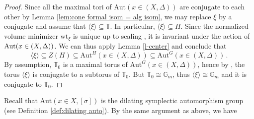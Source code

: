 \documentclass[12pt]{amsart}
\theoremstyle{definition}
\newcommand{\bT}{\mathbb{T}}
\newcommand{\bG}{\mathbb{G}}
\newcommand{\Aut}{\mathrm{Aut}}
\newcommand{\wt}{\mathrm{wt}}
\numberwithin{equation}{section}
\begin{document}
\begin{proof}
Since all the maximal tori of $\Aut(x\in (X,\Delta))$ are conjugate to each other by Lemma \ref{lem:cone formal isom = alg isom}, we may replace $\xi$ by a conjugate and assume that $\langle \xi \rangle\subseteq \bT$. In particular, $\langle \xi \rangle\subseteq H$. Since the normalized volume minimizer $\wt_\xi$ is unique up to scaling \cite{XZ-uniqueness}, it is invariant under the action of ${\rm Aut}(x\in (X,\Delta))$.  We can thus apply Lemma \ref{l-center} and conclude that
\[
\langle \xi \rangle \subseteq Z(H)\subseteq \Aut^H(x\in (X,\Delta))\subseteq \Aut^G(x\in (X,\Delta))\,.
\]
By assumption, $\bT_0$ is a maximal torus of $\Aut^G(x\in (X,\Delta))$, hence by \cite[Section 21.3, Corollary A]{Humphreys-alg-gp}, %
the torus $\langle \xi \rangle$ is conjugate to a subtorus of $\bT_0$. But $\bT_0\cong \bG_m$, thus $\langle\xi\rangle \cong \bG_m$ and it is conjugate to $\bT_0$. 
\end{proof}

Recall that $\Aut(x\in X,[\sigma])$ is the dilating symplectic automorphism group (see Definition \ref{def:dilating auto}). By the same argument as above, we have  %
\end{document}
